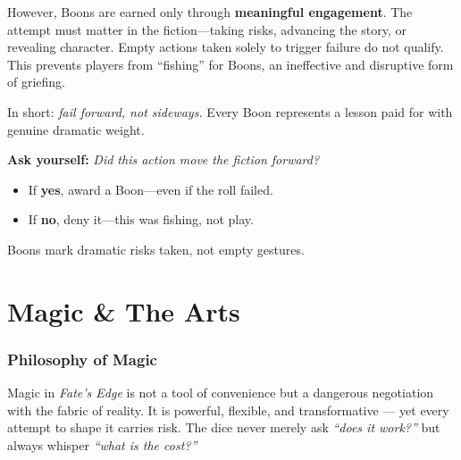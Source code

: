 \documentclass[12pt]{article}
\begin{document}
However, Boons are earned only through \textbf{meaningful engagement}. The attempt must matter in the fiction—taking risks, advancing the story, or revealing character. Empty actions taken solely to trigger failure do not qualify. This prevents players from ``fishing'' for Boons, an ineffective and disruptive form of griefing.  

In short: \emph{fail forward, not sideways.} Every Boon represents a lesson paid for with genuine dramatic weight.

\begin{tcolorbox}[title=GM Callout: Awarding Boons,colback=black!2,colframe=black!40!white]
  \textbf{Ask yourself:} \emph{Did this action move the fiction forward?}  
  
  \begin{itemize}
    \item If \textbf{yes}, award a Boon—even if the roll failed.  
    \item If \textbf{no}, deny it—this was fishing, not play.  
  \end{itemize}
  
  Boons mark dramatic risks taken, not empty gestures.
  \end{tcolorbox}

\part{Magic \& The Arts}

\section{Philosophy of Magic}

Magic in \textit{Fate’s Edge} is not a tool of convenience but a dangerous negotiation with the fabric of reality.  
It is powerful, flexible, and transformative — yet every attempt to shape it carries risk. The dice never merely ask \emph{“does it work?”} but always whisper \emph{“what is the cost?”}
\end{document}
